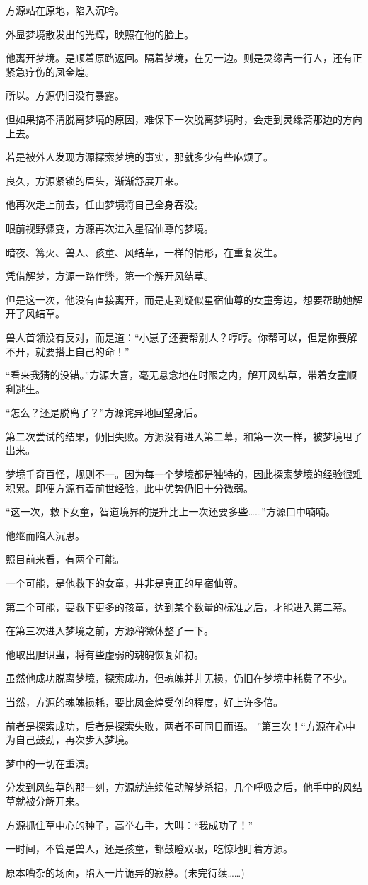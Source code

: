 \begin{this_body}
方源站在原地，陷入沉吟。

外显梦境散发出的光辉，映照在他的脸上。

他离开梦境。是顺着原路返回。隔着梦境，在另一边。则是灵缘斋一行人，还有正紧急疗伤的凤金煌。

所以。方源仍旧没有暴露。

但如果搞不清脱离梦境的原因，难保下一次脱离梦境时，会走到灵缘斋那边的方向上去。

若是被外人发现方源探索梦境的事实，那就多少有些麻烦了。

良久，方源紧锁的眉头，渐渐舒展开来。

他再次走上前去，任由梦境将自己全身吞没。

眼前视野骤变，方源再次进入星宿仙尊的梦境。

暗夜、篝火、兽人、孩童、风结草，一样的情形，在重复发生。

凭借解梦，方源一路作弊，第一个解开风结草。

但是这一次，他没有直接离开，而是走到疑似星宿仙尊的女童旁边，想要帮助她解开了风结草。

兽人首领没有反对，而是道：“小崽子还要帮别人？哼哼。你帮可以，但是你要解不开，就要搭上自己的命！”

“看来我猜的没错。”方源大喜，毫无悬念地在时限之内，解开风结草，带着女童顺利逃生。

“怎么？还是脱离了？”方源诧异地回望身后。

第二次尝试的结果，仍旧失败。方源没有进入第二幕，和第一次一样，被梦境甩了出来。

梦境千奇百怪，规则不一。因为每一个梦境都是独特的，因此探索梦境的经验很难积累。即便方源有着前世经验，此中优势仍旧十分微弱。

“这一次，救下女童，智道境界的提升比上一次还要多些……”方源口中喃喃。

他继而陷入沉思。

照目前来看，有两个可能。

一个可能，是他救下的女童，并非是真正的星宿仙尊。

第二个可能，要救下更多的孩童，达到某个数量的标准之后，才能进入第二幕。

在第三次进入梦境之前，方源稍微休整了一下。

他取出胆识蛊，将有些虚弱的魂魄恢复如初。

虽然他成功脱离梦境，探索成功，但魂魄并非无损，仍旧在梦境中耗费了不少。

当然，方源的魂魄损耗，要比凤金煌受创的程度，好上许多倍。

前者是探索成功，后者是探索失败，两者不可同日而语。 ”第三次！“方源在心中为自己鼓劲，再次步入梦境。

梦中的一切在重演。

分发到风结草的那一刻，方源就连续催动解梦杀招，几个呼吸之后，他手中的风结草就被分解开来。

方源抓住草中心的种子，高举右手，大叫：“我成功了！”

一时间，不管是兽人，还是孩童，都鼓瞪双眼，吃惊地盯着方源。

原本嘈杂的场面，陷入一片诡异的寂静。(未完待续……)

\end{this_body}

